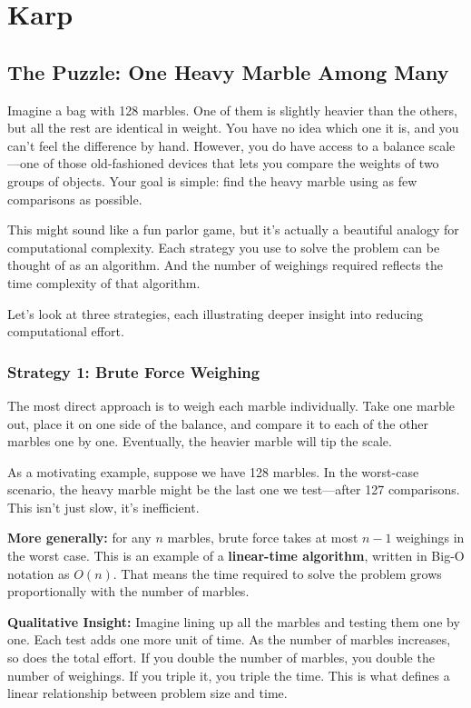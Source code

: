 \section{Karp}

\subsection{The Puzzle: One Heavy Marble Among Many}

Imagine a bag with 128 marbles. One of them is slightly heavier than the others, but all the rest are identical in weight. You have no idea which one it is, and you can’t feel the difference by hand. However, you do have access to a balance scale—one of those old-fashioned devices that lets you compare the weights of two groups of objects. Your goal is simple: find the heavy marble using as few comparisons as possible.

This might sound like a fun parlor game, but it’s actually a beautiful analogy for computational complexity. Each strategy you use to solve the problem can be thought of as an algorithm. And the number of weighings required reflects the time complexity of that algorithm.

Let’s look at three strategies, each illustrating deeper insight into reducing computational effort.

\subsubsection{Strategy 1: Brute Force Weighing}

The most direct approach is to weigh each marble individually. Take one marble out, place it on one side of the balance, and compare it to each of the other marbles one by one. Eventually, the heavier marble will tip the scale.

As a motivating example, suppose we have 128 marbles. In the worst-case scenario, the heavy marble might be the last one we test—after 127 comparisons. This isn't just slow, it’s inefficient.

\textbf{More generally:} for any \( n \) marbles, brute force takes at most \( n - 1 \) weighings in the worst case. This is an example of a \textbf{linear-time algorithm}, written in Big-O notation as \( O(n) \). That means the time required to solve the problem grows proportionally with the number of marbles.

\medskip

\noindent\textbf{Qualitative Insight:} Imagine lining up all the marbles and testing them one by one. Each test adds one more unit of time. As the number of marbles increases, so does the total effort. If you double the number of marbles, you double the number of weighings. If you triple it, you triple the time. This is what defines a linear relationship between problem size and time.

